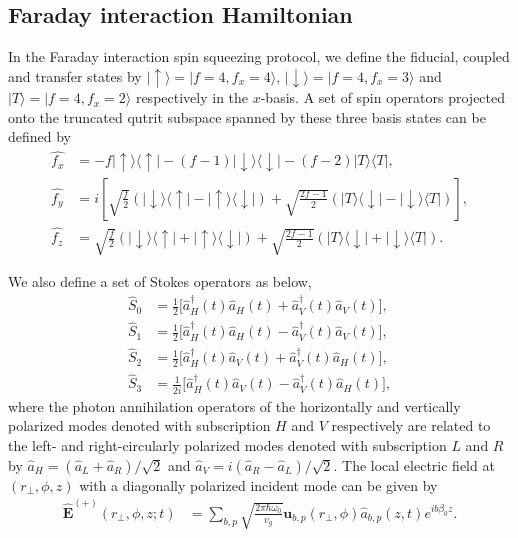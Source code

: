 \documentclass[pra,twocolumn,floatfix,superscriptaddress]{revtex4-1} %
\def\bra#1{\langle{#1}\rvert}%
\def\ket#1{\lvert{#1}\rangle}%
\newcommand{\smallfrac}[2]{\mbox{$\frac{#1}{#2}$}}
\begin{document}
\begin{appendix}

\section{Faraday interaction Hamiltonian} \label{Appendix::FaradayInteractionHamiltonian}
In the Faraday interaction spin squeezing protocol, we define the fiducial, coupled and transfer states by $ \ket{\uparrow}=\ket{f=4,f_x=4} $, $ \ket{\downarrow}=\ket{f=4,f_x=3} $ and $ \ket{T}=\ket{f=4,f_x=2} $ respectively in the $ x $-basis. 
A set of spin operators projected onto the truncated qutrit subspace spanned by these three basis states can be defined by
\begin{align}
\hat{f_x} &= -f \ket{\uparrow}\bra{\uparrow} -(f-1)\ket{\downarrow}\bra{\downarrow}-(f-2)\ket{T}\bra{T},\\
\hat{f_y} &=i\left[\sqrt{\frac{f}{2}}\left(\ket{\downarrow}\bra{\uparrow}-\ket{\uparrow}\bra{\downarrow}\right) +\sqrt{\frac{2f-1}{2}}\left(\ket{T}\bra{\downarrow}-\ket{\downarrow}\bra{T} \right) \right] ,\\
\hat{f_z} &= \sqrt{\frac{f}{2}}\left(\ket{\downarrow}\bra{\uparrow}+\ket{\uparrow}\bra{\downarrow}\right) +\sqrt{\frac{2f-1}{2}}\left(\ket{T}\bra{\downarrow}+\ket{\downarrow}\bra{T} \right).
\end{align}

We also define a set of Stokes operators as below,
\begin{align}
\hat{S}_0 &= \smallfrac{1}{2}\big[ \hat{a}^\dag_H(t) \hat{a}_H(t)+\hat{a}^\dag_V(t) \hat{a}_V(t) \big],\\
\hat{S}_1 &= \smallfrac{1}{2}\big[ \hat{a}^\dag_H(t) \hat{a}_H(t)-\hat{a}^\dag_V(t) \hat{a}_V(t) \big],\\
\hat{S}_2 &= \smallfrac{1}{2}\big[ \hat{a}^\dag_H(t) \hat{a}_V(t)+\hat{a}^\dag_V(t) \hat{a}_H(t) \big],\\
\hat{S}_3 &= \smallfrac{1}{2i}\big[ \hat{a}^\dag_H(t) \hat{a}_V(t) -\hat{a}^\dag_V(t) \hat{a}_H(t) \big],
\end{align}
where the photon annihilation operators of the horizontally and vertically polarized modes denoted with subscription $ H $ and $ V $ respectively are related to the left- and right-circularly polarized modes denoted with subscription $ L $ and $ R $ by $ \hat{a}_{H}=(\hat{a}_L+\hat{a}_R) /\sqrt{2}$ and $ \hat{a}_{V}=i(\hat{a}_R-\hat{a}_L)/\sqrt{2} $.
The local electric field at $ (r\!_\perp,\phi,z) $ with a diagonally polarized incident mode can be given by
\begin{align}
\hat{\mathbf{E}}^{(+)}(r\!_\perp,\phi,z;t) &= \sum_{b,p} \sqrt{ \frac{2 \pi \hbar \omega_0}{ v_g} } \mathbf{u}_{b,p}(r\!_\perp,\phi) \hat{a}_{b,p}(z,t)  e^{i b \beta_0 z}.
\end{align}


\end{appendix}
\end{document}
